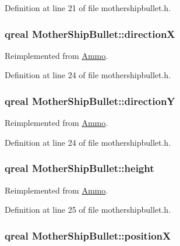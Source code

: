 Definition at line 21 of file mothershipbullet.h.\hypertarget{class_mother_ship_bullet_a7595f4bddbfe83bb5467adc3d06b24a7}{
\subsubsection[{directionX}]{\setlength{\rightskip}{0pt plus 5cm}qreal {\bf MotherShipBullet::directionX}}}
\label{class_mother_ship_bullet_a7595f4bddbfe83bb5467adc3d06b24a7}


Reimplemented from \hyperlink{class_ammo_a60392d67523d0cf6d46e14b6b3f1ae05}{Ammo}.

Definition at line 24 of file mothershipbullet.h.\hypertarget{class_mother_ship_bullet_a886c10db617ba9341d34487514ffd79f}{
\subsubsection[{directionY}]{\setlength{\rightskip}{0pt plus 5cm}qreal {\bf MotherShipBullet::directionY}}}
\label{class_mother_ship_bullet_a886c10db617ba9341d34487514ffd79f}


Reimplemented from \hyperlink{class_ammo_a1156ff1439690bf121841528585aa026}{Ammo}.

Definition at line 24 of file mothershipbullet.h.\hypertarget{class_mother_ship_bullet_a76e8ce486a76094373b5afacfc754b8a}{
\subsubsection[{height}]{\setlength{\rightskip}{0pt plus 5cm}qreal {\bf MotherShipBullet::height}}}
\label{class_mother_ship_bullet_a76e8ce486a76094373b5afacfc754b8a}


Reimplemented from \hyperlink{class_ammo_a7ee07e5c3778fe15aeef8126a5251e3b}{Ammo}.

Definition at line 25 of file mothershipbullet.h.\hypertarget{class_mother_ship_bullet_a5a9173af31257e18fa08bcb1b30afe11}{
\subsubsection[{positionX}]{\setlength{\rightskip}{0pt plus 5cm}qreal {\bf MotherShipBullet::positionX}}}
\label{class_mother_ship_bullet_a5a9173af31257e18fa08bcb1b30afe11}


